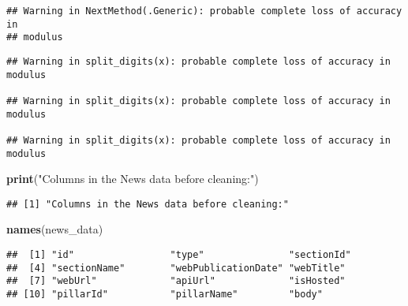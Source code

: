 \documentclass[]{article}
\newenvironment{Shaded}{\begin{snugshade}}{\end{snugshade}}
\newcommand{\KeywordTok}[1]{\textcolor[rgb]{0.13,0.29,0.53}{\textbf{#1}}}
\newcommand{\DataTypeTok}[1]{\textcolor[rgb]{0.13,0.29,0.53}{#1}}
\newcommand{\StringTok}[1]{\textcolor[rgb]{0.31,0.60,0.02}{#1}}
\newcommand{\OperatorTok}[1]{\textcolor[rgb]{0.81,0.36,0.00}{\textbf{#1}}}
\newcommand{\NormalTok}[1]{#1}
\begin{document}
\begin{verbatim}
## Warning in NextMethod(.Generic): probable complete loss of accuracy in
## modulus
\end{verbatim}

\begin{verbatim}
## Warning in split_digits(x): probable complete loss of accuracy in modulus

## Warning in split_digits(x): probable complete loss of accuracy in modulus

## Warning in split_digits(x): probable complete loss of accuracy in modulus
\end{verbatim}

\begin{Shaded}
\begin{Highlighting}[]
\KeywordTok{print}\NormalTok{(}\StringTok{"Columns in the News data before cleaning:"}\NormalTok{)}
\end{Highlighting}
\end{Shaded}

\begin{verbatim}
## [1] "Columns in the News data before cleaning:"
\end{verbatim}

\begin{Shaded}
\begin{Highlighting}[]
\KeywordTok{names}\NormalTok{(news_data)}
\end{Highlighting}
\end{Shaded}

\begin{verbatim}
##  [1] "id"                 "type"               "sectionId"         
##  [4] "sectionName"        "webPublicationDate" "webTitle"          
##  [7] "webUrl"             "apiUrl"             "isHosted"          
## [10] "pillarId"           "pillarName"         "body"
\end{verbatim}

\begin{Shaded}
\end{Shaded}
\end{document}

